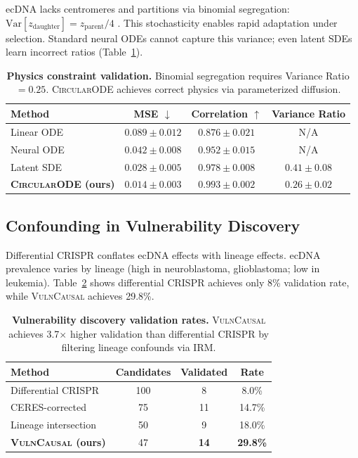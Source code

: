 \documentclass{article}
\newcommand{\circularode}{\textsc{CircularODE}}
\newcommand{\vulncausal}{\textsc{VulnCausal}}
\begin{document}
ecDNA lacks centromeres and partitions via binomial segregation: $\text{Var}[z_{\text{daughter}}] = z_{\text{parent}}/4$ \citep{lange_2022_mathematical}. This stochasticity enables rapid adaptation under selection. Standard neural ODEs cannot capture this variance; even latent SDEs learn incorrect ratios (Table~\ref{tab:physics}).

\begin{table}[t]
\caption{\textbf{Physics constraint validation.} Binomial segregation requires Variance Ratio $= 0.25$. \circularode{} achieves correct physics via parameterized diffusion.}
\label{tab:physics}
\centering
\small
\begin{tabular}{@{}lccc@{}}
\toprule
Method & MSE $\downarrow$ & Correlation $\uparrow$ & Variance Ratio \\
\midrule
Linear ODE & $0.089 \pm 0.012$ & $0.876 \pm 0.021$ & N/A \\
Neural ODE & $0.042 \pm 0.008$ & $0.952 \pm 0.015$ & N/A \\
Latent SDE & $0.028 \pm 0.005$ & $0.978 \pm 0.008$ & $0.41 \pm 0.08$ \\
\textbf{\circularode{} (ours)} & $\mathbf{0.014 \pm 0.003}$ & $\mathbf{0.993 \pm 0.002}$ & $\mathbf{0.26 \pm 0.02}$ \\
\bottomrule
\end{tabular}
\end{table}

\subsection{Confounding in Vulnerability Discovery}
\label{sec:confounding}

Differential CRISPR conflates ecDNA effects with lineage effects. ecDNA prevalence varies by lineage (high in neuroblastoma, glioblastoma; low in leukemia). Table~\ref{tab:confounding} shows differential CRISPR achieves only 8\% validation rate, while \vulncausal{} achieves 29.8\%.

\begin{table}[t]
\caption{\textbf{Vulnerability discovery validation rates.} \vulncausal{} achieves 3.7$\times$ higher validation than differential CRISPR by filtering lineage confounds via IRM.}
\label{tab:confounding}
\centering
\small
\begin{tabular}{@{}lccc@{}}
\toprule
Method & Candidates & Validated & Rate \\
\midrule
Differential CRISPR & 100 & 8 & 8.0\% \\
CERES-corrected & 75 & 11 & 14.7\% \\
Lineage intersection & 50 & 9 & 18.0\% \\
\textbf{\vulncausal{} (ours)} & 47 & \textbf{14} & \textbf{29.8\%} \\
\bottomrule
\end{tabular}
\end{table}
\end{document}
